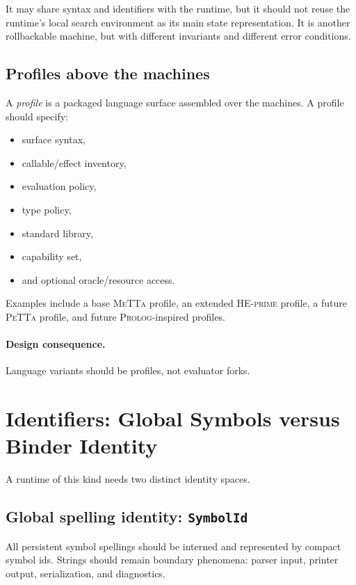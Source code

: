 \documentclass[11pt]{article}
\newcommand{\metta}{\textsc{MeTTa}}
\newcommand{\heprime}{\textsc{HE-prime}}
\newcommand{\petta}{\textsc{PeTTa}}
\newcommand{\prolog}{\textsc{Prolog}}
\newcommand{\symid}{\texttt{SymbolId}}
\begin{document}
It may share syntax and identifiers with the runtime, but it should not reuse the runtime's local search environment as its main state representation. It is another rollbackable machine, but with different invariants and different error conditions.

\subsection{Profiles above the machines}

A \emph{profile} is a packaged language surface assembled over the machines. A profile should specify:
\begin{itemize}[leftmargin=2em]
  \item surface syntax,
  \item callable/effect inventory,
  \item evaluation policy,
  \item type policy,
  \item standard library,
  \item capability set,
  \item and optional oracle/resource access.
\end{itemize}

Examples include a base \metta{} profile, an extended \heprime{} profile, a future \petta{} profile, and future \prolog{}-inspired profiles.

\paragraph{Design consequence.}
Language variants should be profiles, not evaluator forks.

\section{Identifiers: Global Symbols versus Binder Identity}

A runtime of this kind needs two distinct identity spaces.

\subsection{Global spelling identity: \symid{}}

All persistent symbol spellings should be interned and represented by compact symbol ids. Strings should remain boundary phenomena: parser input, printer output, serialization, and diagnostics.
\end{document}
